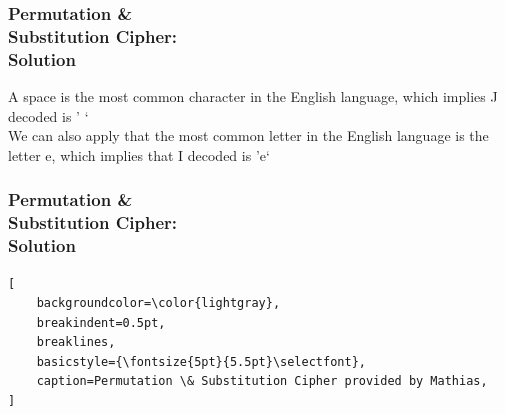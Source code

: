 \documentclass{uva-inf-presentation}
\begin{document}
\begin{frame}
\frametitle{Permutation \&\\ Substitution Cipher:\\ Solution}
A space is the most common character in the English language,
which implies J decoded is ' `\\

We can also apply that the most common letter in the English language is the
letter e, which implies that I decoded is 'e`
\end{frame}

\begin{frame}[containsverbatim]
\frametitle{Permutation \&\\ Substitution Cipher:\\ Solution}
\vspace{-20pt}
\begin{lstlisting}[
    backgroundcolor=\color{lightgray},
    breakindent=0.5pt,
    breaklines,
    basicstyle={\fontsize{5pt}{5.5pt}\selectfont},
    caption=Permutation \& Substitution Cipher provided by Mathias,
]

\end{lstlisting}
\end{frame}
\end{document}
